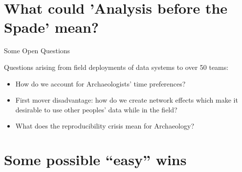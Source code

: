\documentclass[aspectratio=1610, 11pt]{beamer} %
\begin{document}
\section{What could 'Analysis before the Spade' mean?}

\begin{frame}{Some Open Questions}

Questions arising from field deployments of data systems to over 50 teams:

\begin{itemize}[label=\textbullet]
    \item How do we account for Archaeologists' time preferences?
    \item First mover disadvantage: how do we create network effects which make it desirable to use other peoples' data while in the field?
    \item What does the reproducibility crisis mean for Archaeology?
\end{itemize}



\end{frame}


\section{Some possible ``easy'' wins}
\end{document}
